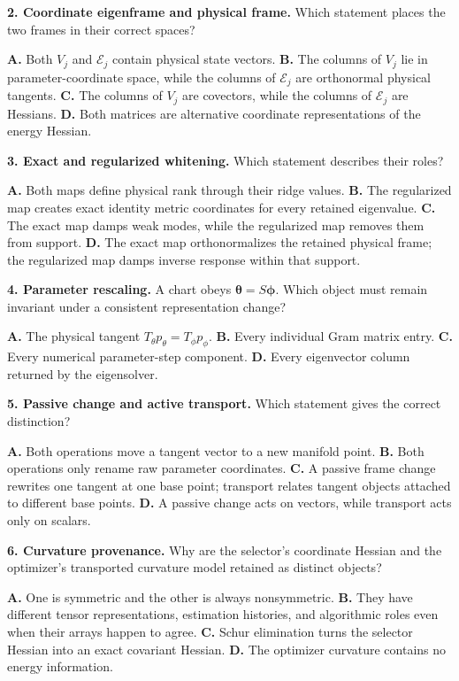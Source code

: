 \documentclass[10pt,twocolumn]{article}
\begin{document}
\textbf{2. Coordinate eigenframe and physical frame.}
Which statement places the two frames in their correct spaces?

\textbf{A.} Both \(V_j\) and \(\mathcal E_j\) contain physical state vectors.\quad
\textbf{B.} The columns of \(V_j\) lie in parameter-coordinate space, while
the columns of \(\mathcal E_j\) are orthonormal physical tangents.\quad
\textbf{C.} The columns of \(V_j\) are covectors, while the columns of
\(\mathcal E_j\) are Hessians.\quad
\textbf{D.} Both matrices are alternative coordinate representations of the
energy Hessian.

\textbf{3. Exact and regularized whitening.}
Which statement describes their roles?

\textbf{A.} Both maps define physical rank through their ridge values.\quad
\textbf{B.} The regularized map creates exact identity metric coordinates for
every retained eigenvalue.\quad
\textbf{C.} The exact map damps weak modes, while the regularized map removes
them from support.\quad
\textbf{D.} The exact map orthonormalizes the retained physical frame; the
regularized map damps inverse response within that support.

\textbf{4. Parameter rescaling.}
A chart obeys \(\bm\theta=S\bm\phi\). Which object must remain invariant under
a consistent representation change?

\textbf{A.} The physical tangent \(T_\theta p_\theta=T_\phi p_\phi\).\quad
\textbf{B.} Every individual Gram matrix entry.\quad
\textbf{C.} Every numerical parameter-step component.\quad
\textbf{D.} Every eigenvector column returned by the eigensolver.

\textbf{5. Passive change and active transport.}
Which statement gives the correct distinction?

\textbf{A.} Both operations move a tangent vector to a new manifold point.\quad
\textbf{B.} Both operations only rename raw parameter coordinates.\quad
\textbf{C.} A passive frame change rewrites one tangent at one base point;
transport relates tangent objects attached to different base points.\quad
\textbf{D.} A passive change acts on vectors, while transport acts only on
scalars.

\textbf{6. Curvature provenance.}
Why are the selector's coordinate Hessian and the optimizer's transported
curvature model retained as distinct objects?

\textbf{A.} One is symmetric and the other is always nonsymmetric.\quad
\textbf{B.} They have different tensor representations, estimation histories,
and algorithmic roles even when their arrays happen to agree.\quad
\textbf{C.} Schur elimination turns the selector Hessian into an exact
covariant Hessian.\quad
\textbf{D.} The optimizer curvature contains no energy information.
\end{document}
